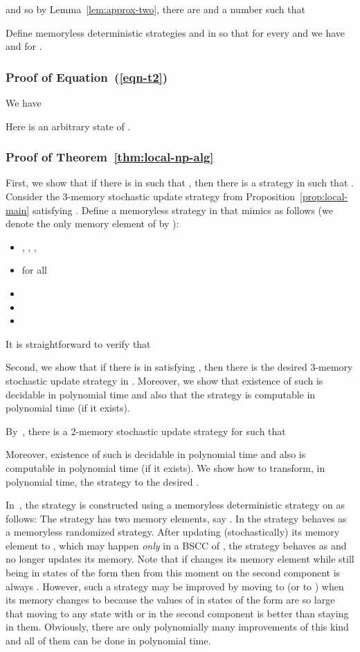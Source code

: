 and so by Lemma~\ref{lem:approx-two}, there are  and a number  such that

Define memoryless deterministic strategies  and  in  so that for every  and  we have
 and  for .





\subsubsection{Proof of Equation~(\ref{eqn-t2})}\label{app-eqn-t2}
We have

Here  is an arbitrary state of .
\subsubsection{Proof of Theorem~\ref{thm:local-np-alg}}\label{app-local-np-alg}
First, we show that if there is  in  such that
, then there is a strategy  in  such that . 
Consider the 3-memory stochastic update strategy  from Proposition~\ref{prop:local-main} satisfying
. Define a memoryless strategy  in  that mimics  as follows (we denote the only memory element of  by ):
\begin{itemize}
\item ,  , ,
\item   for all 
\item 
\item 
\item 
\end{itemize}
It is straightforward to verify that 



\noindent
Second, we show that if there is  in  satisfying 
, then
there is the desired 3-memory stochastic update strategy  in . Moreover, we show that existence of such  is decidable in polynomial time and also that the strategy is computable in polynomial time (if it exists).

By~\cite{BBCFK:MDP-two-views}, there is a 2-memory stochastic update strategy  for  such that 

Moreover, existence of such  is decidable in polynomial time and also  is computable in polynomial time (if it exists). We show how to transform, in polynomial time, the strategy  to the desired .

In~\cite{BBCFK:MDP-two-views}, the strategy  is constructed using a memoryless deterministic strategy  on  as follows: The strategy  has two memory elements, say . In  the strategy  behaves as a memoryless randomized strategy. After updating (stochastically) its memory element to , which may happen {\em only} in a BSCC of , the strategy  behaves as  and no longer updates its memory. 
Note that if  changes its memory element while still being in states of the form  then from this moment on the second component is always . However, such a strategy may be improved by moving to  (or to ) when its memory changes to  because the values of  in states of the form  are so large that moving to any state with  or  in the second component is better than staying in them. Obviously, there are only polynomially many improvements of this kind and all of them can be done in polynomial time.

